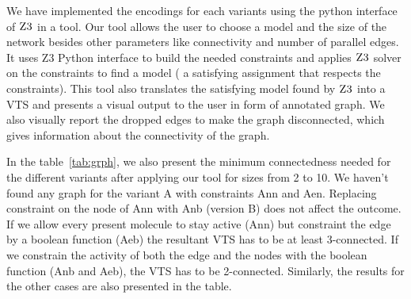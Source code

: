 
%

We have implemented the encodings for each variants
using the python interface of $\textsc{Z3}$ in a tool.
%
Our tool allows the user to choose a model and the size of the network
besides other parameters like connectivity and number of parallel
edges.
%
It uses Z3 Python interface to build the needed constraints and
applies $\textsc{Z3}$ solver on the constraints to find a model (
a satisfying assignment that respects the constraints).
%
This tool also translates the satisfying model found by $\textsc{Z3}$ into
a VTS and presents a visual output to the user in form of annotated graph.
%
%
%
We also visually report the dropped edges to make the graph
disconnected, which gives information about the connectivity of the
graph.


In the table~\ref{tab:grph}, we also present the minimum connectedness needed for
the different variants after applying our tool for sizes from 2 to 10.
%
We haven't found any graph for the variant A with constraints Ann and Aen.
%
Replacing constraint on the node of Ann with Anb (version B) does not affect the outcome.
%
If we allow every present molecule to stay active (Ann) but constraint the edge
by a boolean function (Aeb) the resultant VTS has to be at least 3-connected.
%
If we constrain the activity of both the edge and the nodes with the boolean function (Anb and Aeb), 
the VTS has to be 2-connected.
%
Similarly, the results for the other cases are also presented in the table.


